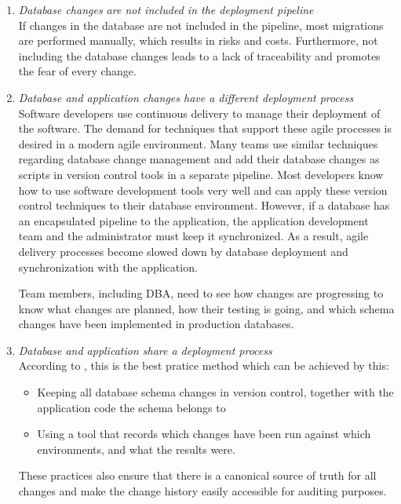 \begin{enumerate}
	\item \textit{Database changes are not included in the deployment pipeline}\\
	If changes in the database are not included in the pipeline, most migrations are performed manually, which results in risks and costs. Furthermore, not including the database changes leads to a lack of traceability and promotes the fear of every change.	
	
	\item \textit{Database and application changes have a different deployment process}\\
	Software developers use continuous delivery to manage their deployment of the software. The demand for techniques that support these agile processes is desired in a modern agile environment. Many teams use similar techniques regarding database change management and add their database changes as scripts in version control tools in a separate pipeline. Most developers know how to use software development tools very well and can apply these version control techniques to their database environment. However, if a database has an encapsulated pipeline to the application, the application development team and the administrator must keep it synchronized. As a result, agile delivery processes become slowed down by database deployment and synchronization with the application.

	Team members, including \gls{DBA}, need to see how changes are progressing to know what changes are planned, how their testing is going, and which schema changes have been implemented in production databases.
	
	\item \textit{Database and application share a deployment process}\\
	According to  \cite{GoogleDevOps2022}, this is the best pratice method which can be achieved by this:
	\begin{itemize}
		\item Keeping all database schema changes in version control, together with the application code the schema belongs to
		\item Using a tool that records which changes have been run against which environments, and what the results were.
	\end{itemize}
	These practices also ensure that there is a canonical source of truth for all changes and make the change history easily accessible for auditing purposes.
\end{enumerate}



